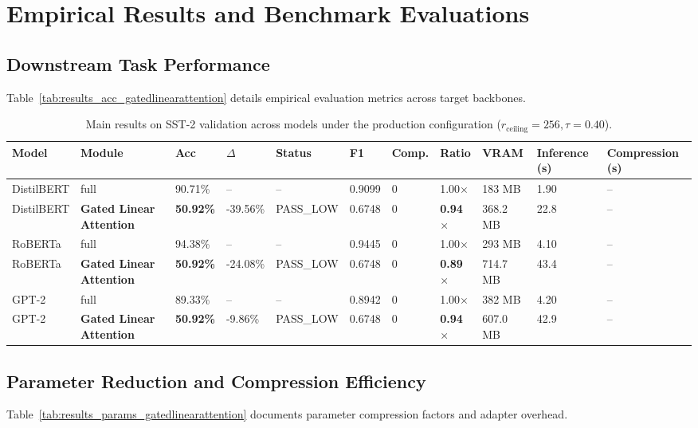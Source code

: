 \section{Empirical Results and Benchmark Evaluations}

\subsection{Downstream Task Performance}
Table~\ref{tab:results_acc_gatedlinearattention} details empirical evaluation metrics across target backbones.

\begin{table}[t]
\centering
\small
\begin{tabular}{lllllllllll}
\toprule
\textbf{Model} & \textbf{Module} & \textbf{Acc} & \textbf{$\Delta$} & \textbf{Status} & \textbf{F1} & \textbf{Comp.} & \textbf{Ratio} & \textbf{VRAM} & \textbf{Inference (s)} & \textbf{Compression (s)} \\
\midrule
DistilBERT & full & 90.71\% & -- & -- & 0.9099 & 0 & 1.00$\times$ & 183 MB & 1.90 & -- \\
DistilBERT & \textbf{Gated Linear Attention} & \textbf{50.92\%} & -39.56\% & PASS\_LOW & 0.6748 & 0 & \textbf{0.94$\times$} & 368.2 MB & 22.8 & -- \\
RoBERTa & full & 94.38\% & -- & -- & 0.9445 & 0 & 1.00$\times$ & 293 MB & 4.10 & -- \\
RoBERTa & \textbf{Gated Linear Attention} & \textbf{50.92\%} & -24.08\% & PASS\_LOW & 0.6748 & 0 & \textbf{0.89$\times$} & 714.7 MB & 43.4 & -- \\
GPT-2 & full & 89.33\% & -- & -- & 0.8942 & 0 & 1.00$\times$ & 382 MB & 4.20 & -- \\
GPT-2 & \textbf{Gated Linear Attention} & \textbf{50.92\%} & -9.86\% & PASS\_LOW & 0.6748 & 0 & \textbf{0.94$\times$} & 607.0 MB & 42.9 & -- \\
\bottomrule
\end{tabular}
\caption{Main results on SST-2 validation across models under the production configuration ($r_{\mathrm{ceiling}}=256, \tau=0.40$).}
\label{tab:main_sst2}
\end{table}

\subsection{Parameter Reduction and Compression Efficiency}
Table~\ref{tab:results_params_gatedlinearattention} documents parameter compression factors and adapter overhead.

